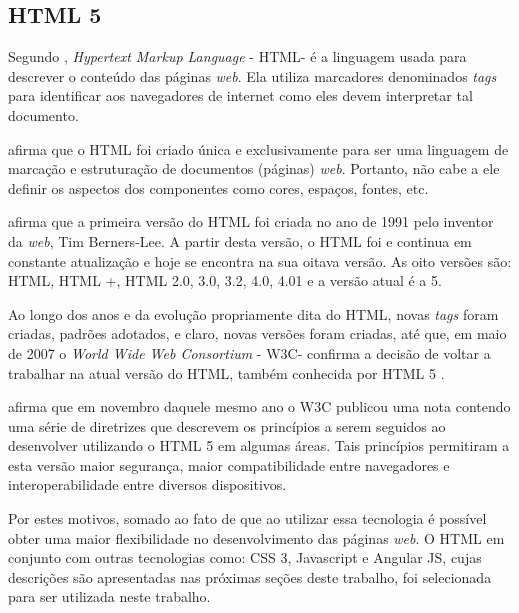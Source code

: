 \subsection{HTML 5}

Segundo , \textit{Hypertext Markup Language}  - HTML\footnotemark[26] - é a linguagem usada para descrever o conteúdo das páginas \textit{web}. Ela utiliza marcadores denominados \textit{tags} para identificar aos navegadores de internet como eles devem interpretar tal documento.


 afirma que o HTML foi criado única e exclusivamente para ser uma linguagem de marcação e estruturação de documentos (páginas) \textit{web}. Portanto, não cabe a ele definir os aspectos dos componentes como cores, espaços, fontes, etc.

 afirma que a primeira versão do HTML foi criada no ano de 1991 pelo inventor da \textit{web}, Tim Berners-Lee. A partir desta versão, o HTML foi e continua em constante atualização e hoje se encontra na sua oitava versão. As oito versões são: HTML, HTML +, HTML 2.0, 3.0, 3.2, 4.0, 4.01 e a versão atual é a 5.

Ao longo dos anos e da evolução propriamente dita do HTML, novas \textit{tags} foram criadas, padrões adotados, e claro, novas versões foram criadas, até que, em maio de 2007  o \textit{World Wide Web Consortium} - W3C\footnotemark[27] - confirma a decisão de voltar a trabalhar na atual versão do HTML, também conhecida por HTML 5 \cite{w3c_html_fundamentals}.


 afirma que em novembro daquele mesmo ano o W3C publicou uma nota contendo uma série de diretrizes que descrevem os princípios a serem seguidos ao desenvolver utilizando o HTML 5 em algumas áreas. Tais princípios permitiram a esta versão maior segurança, maior compatibilidade entre navegadores e interoperabilidade entre diversos dispositivos.

Por estes motivos, somado ao fato de que ao utilizar essa tecnologia é possível obter uma maior flexibilidade no desenvolvimento das páginas \textit{web}. O HTML em conjunto com outras tecnologias como: CSS 3, Javascript e Angular JS, cujas descrições são apresentadas nas próximas seções deste trabalho, foi selecionada para ser utilizada neste trabalho.